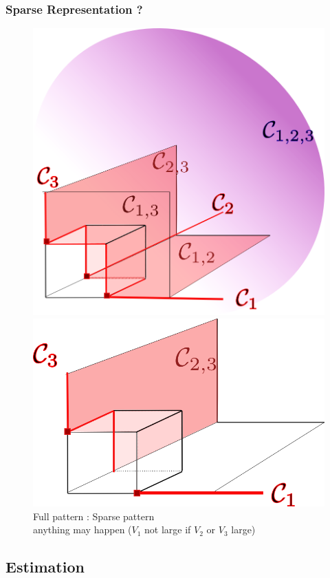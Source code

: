 \documentclass[10pt]{beamer}
\begin{document}
\begin{frame}
\frametitle{Sparse Representation ?}
  \begin{figure}
    \centering
    \includegraphics[width=0.4\linewidth]{sourcefigs/3D_anyH}\qquad 
    \includegraphics[width=0.4\linewidth]{sourcefigs/3D_sparseH} \\

 Full pattern : 
\hspace{3cm}   Sparse pattern  \\
{\footnotesize anything may happen}  \hspace{2cm} {\footnotesize ($V_1$ not large if
 $V_2$ or $V_3$ large)}
  \end{figure}
\end{frame}


\subsection{Estimation}
\end{document}
